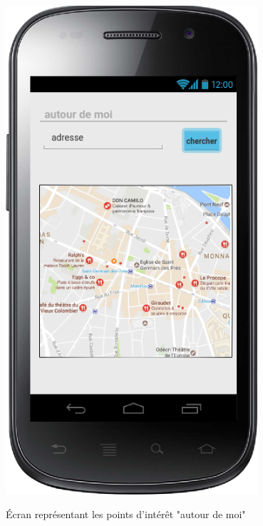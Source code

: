 \documentclass[a4paper, 12pt, notitlepage]{article} %
\begin{document}
\begin{maquetteFig}[!htb]
  \centering
     \includegraphics[width=0.7\textwidth]{autour_de_moi.png}
     \caption{Écran représentant les points d'intérêt "autour de moi"}
     \label{Maquette:AutourDeMoi}
\end{maquetteFig}
\end{document}
